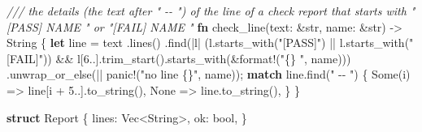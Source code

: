 \documentclass[
  10pt,
]{article}
\newenvironment{Shaded}{}{}
\newcommand{\CommentTok}[1]{\textcolor[rgb]{0.38,0.63,0.69}{\textit{#1}}}
\newcommand{\ConstantTok}[1]{\textcolor[rgb]{0.53,0.00,0.00}{#1}}
\newcommand{\ControlFlowTok}[1]{\textcolor[rgb]{0.00,0.44,0.13}{\textbf{#1}}}
\newcommand{\DataTypeTok}[1]{\textcolor[rgb]{0.56,0.13,0.00}{#1}}
\newcommand{\DecValTok}[1]{\textcolor[rgb]{0.25,0.63,0.44}{#1}}
\newcommand{\KeywordTok}[1]{\textcolor[rgb]{0.00,0.44,0.13}{\textbf{#1}}}
\newcommand{\NormalTok}[1]{#1}
\newcommand{\OperatorTok}[1]{\textcolor[rgb]{0.40,0.40,0.40}{#1}}
\newcommand{\PreprocessorTok}[1]{\textcolor[rgb]{0.74,0.48,0.00}{#1}}
\newcommand{\StringTok}[1]{\textcolor[rgb]{0.25,0.44,0.63}{#1}}
\begin{document}
\begin{Shaded}
\begin{Highlighting}[]
\CommentTok{/// the details (the text after "  {-}{-} ") of the line of a check report that starts with "[PASS] NAME " or "[FAIL] NAME "}
\KeywordTok{fn}\NormalTok{ check\_line(text}\OperatorTok{:} \OperatorTok{\&}\DataTypeTok{str}\OperatorTok{,}\NormalTok{ name}\OperatorTok{:} \OperatorTok{\&}\DataTypeTok{str}\NormalTok{) }\OperatorTok{{-}\textgreater{}} \DataTypeTok{String} \OperatorTok{\{}
    \KeywordTok{let}\NormalTok{ line }\OperatorTok{=}\NormalTok{ text}
        \OperatorTok{.}\NormalTok{lines()}
        \OperatorTok{.}\NormalTok{find(}\OperatorTok{|}\NormalTok{l}\OperatorTok{|}\NormalTok{ (l}\OperatorTok{.}\NormalTok{starts\_with(}\StringTok{"[PASS]"}\NormalTok{) }\OperatorTok{||}\NormalTok{ l}\OperatorTok{.}\NormalTok{starts\_with(}\StringTok{"[FAIL]"}\NormalTok{)) }\OperatorTok{\&\&}\NormalTok{ l[}\DecValTok{6}\OperatorTok{..}\NormalTok{]}\OperatorTok{.}\NormalTok{trim\_start()}\OperatorTok{.}\NormalTok{starts\_with(}\OperatorTok{\&}\PreprocessorTok{format!}\NormalTok{(}\StringTok{"\{\} "}\OperatorTok{,}\NormalTok{ name)))}
        \OperatorTok{.}\NormalTok{unwrap\_or\_else(}\OperatorTok{||} \PreprocessorTok{panic!}\NormalTok{(}\StringTok{"no line \{\}"}\OperatorTok{,}\NormalTok{ name))}\OperatorTok{;}
    \ControlFlowTok{match}\NormalTok{ line}\OperatorTok{.}\NormalTok{find(}\StringTok{"  {-}{-} "}\NormalTok{) }\OperatorTok{\{}
        \ConstantTok{Some}\NormalTok{(i) }\OperatorTok{=\textgreater{}}\NormalTok{ line[i }\OperatorTok{+} \DecValTok{5}\OperatorTok{..}\NormalTok{]}\OperatorTok{.}\NormalTok{to\_string()}\OperatorTok{,}
        \ConstantTok{None} \OperatorTok{=\textgreater{}}\NormalTok{ line}\OperatorTok{.}\NormalTok{to\_string()}\OperatorTok{,}
    \OperatorTok{\}}
\OperatorTok{\}}

\KeywordTok{struct}\NormalTok{ Report }\OperatorTok{\{}
\NormalTok{    lines}\OperatorTok{:} \DataTypeTok{Vec}\OperatorTok{\textless{}}\DataTypeTok{String}\OperatorTok{\textgreater{},}
\NormalTok{    ok}\OperatorTok{:} \DataTypeTok{bool}\OperatorTok{,}
\OperatorTok{\}}


\end{Highlighting}
\end{Shaded}
\end{document}
